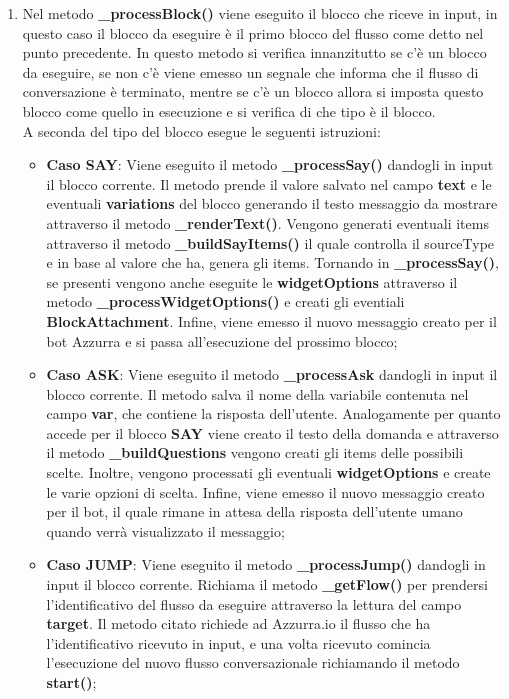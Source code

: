 \begin{enumerate}
	\item Nel metodo \textbf{\_processBlock()} viene eseguito il blocco che riceve in input, in questo caso il blocco da eseguire è il primo blocco del flusso come detto nel punto precedente. In questo metodo si verifica innanzitutto se c'è un blocco da eseguire, se non c'è viene emesso un segnale che informa che il flusso di conversazione è terminato, mentre se c'è un blocco allora si imposta questo blocco come quello in esecuzione e si verifica di che tipo è il blocco.\\
	A seconda del tipo del blocco esegue le seguenti istruzioni:
	\begin{itemize}
		\item \textbf{Caso SAY}: Viene eseguito il metodo \textbf{\_processSay()} dandogli in input il blocco corrente. Il metodo prende il valore salvato nel campo \textbf{text} e le eventuali \textbf{variations} del blocco generando il testo messaggio da mostrare attraverso il metodo \textbf{\_renderText()}. Vengono generati eventuali items attraverso il metodo \textbf{\_buildSayItems()} il quale controlla il sourceType e in base al valore che ha, genera gli items. Tornando in \textbf{\_processSay()}, se presenti vengono anche eseguite le \textbf{widgetOptions} attraverso il metodo \textbf{\_processWidgetOptions()} e creati gli eventiali \textbf{BlockAttachment}. Infine, viene emesso il nuovo messaggio creato per il bot Azzurra e si passa all'esecuzione del prossimo blocco;
		\item \textbf{Caso ASK}: Viene eseguito il metodo \textbf{\_processAsk} dandogli in input il blocco corrente. Il metodo salva il nome della variabile contenuta nel campo \textbf{var}, che contiene la risposta dell'utente. Analogamente per quanto accede per il blocco \textbf{SAY} viene creato il testo della domanda e attraverso il metodo \textbf{\_buildQuestions} vengono creati gli items delle possibili scelte. Inoltre, vengono processati gli eventuali \textbf{widgetOptions} e create le varie opzioni di scelta. Infine, viene emesso il nuovo messaggio creato per il bot, il quale rimane in attesa della risposta dell'utente umano quando verrà visualizzato il messaggio;
		\item \textbf{Caso JUMP}: Viene eseguito il metodo \textbf{\_processJump()} dandogli in input il blocco corrente. Richiama il metodo \textbf{\_getFlow()} per prendersi l'identificativo del flusso da eseguire attraverso la lettura del campo \textbf{target}. Il metodo citato richiede ad Azzurra.io il flusso che ha l'identificativo ricevuto in input, e una volta ricevuto comincia l'esecuzione del nuovo flusso conversazionale richiamando il metodo \textbf{start()};

\end{itemize}
\end{enumerate}
